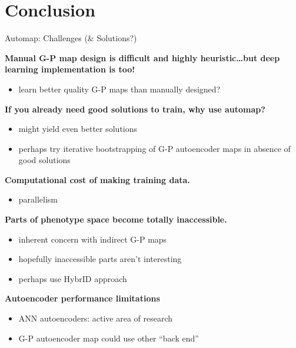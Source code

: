 \section{Conclusion}

\begin{frame}{Automap: Challenges (\& Solutions?)}

\textbf{Manual G-P map design is difficult and highly heuristic\dots but deep
learning implementation is too!}
\pause
\vspace{-1ex}
\begin{itemize}[<+->]
\itemsep0em
\item learn better quality G-P maps than manually designed?
\end{itemize}
\vspace{-1ex}
\pause
\textbf{If you already need good solutions to train, why use automap?}
\pause
\vspace{-1ex}
\begin{itemize}[<+->]
\itemsep0em
\item might yield even better solutions
\item perhaps try iterative bootstrapping of G-P autoencoder maps in absence of good solutions
\end{itemize}
\vspace{-1ex}
\pause
\textbf{Computational cost of making training data.}
\pause
\vspace{-1ex}
\begin{itemize}[<+->]
\itemsep0em
\item parallelism
\end{itemize}
\vspace{-1ex}
\pause
\textbf{Parts of phenotype space become totally inaccessible.}
\pause
\vspace{-1ex}
\begin{itemize}[<+->]
\itemsep0em
\item inherent concern with indirect G-P maps \cite{clune2008generative}
\item hopefully inaccessible parts aren't interesting
\item perhaps use HybrID approach \cite{clune2009hybrid}
\end{itemize}
\vspace{-1ex}
\pause
\textbf{Autoencoder performance limitations}
\pause
\vspace{-1ex}
\begin{itemize}[<+->]
\itemsep0em
\item ANN autoencoders: active area of research
\item G-P autoencoder map could use other ``back end''
\end{itemize}

\end{frame}

